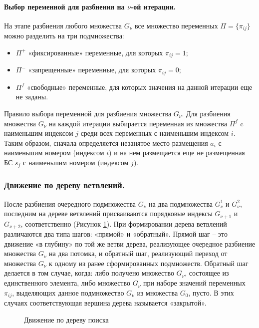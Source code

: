 \paragraph{Выбор переменной для разбиения на $\nu$-ой итерации.}

На этапе разбиения любого множества $G_\nu$ все множество переменных $\Pi = \{\pi_{ij}\}$ можно разделить на три подмножества: 

\begin{itemize}
  \item $\Pi^+$ «фиксированные» переменные, для которых $\pi_{ij}=1$;
  \item $\Pi^-$ «запрещенные» переменные, для которых $\pi_{ij}=0$;
  \item $\Pi^f$ «свободные» переменные, для которых значения на данной итерации еще не заданы.
\end{itemize}
Правило выбора переменной для разбиения множества $G_\nu$. Для разбиения множества $G_\nu$ на каждой итерации выбирается переменная из множества $\Pi^f$ c наименьшим индексом $j$ среди всех переменных с наименьшим индексом $i$. Таким образом, сначала определяется незанятое место размещения $a_i$ с наименьшим номером (индексом $i$) и на нем размещается еще не размещенная БС $s_j$ с наименьшим номером (индексом $j$).

\subsubsection{Движение по дереву ветвлений.}

После разбиения очередного подмножества $G_\nu$ на два подмножества $G^1_\nu$  и $G^2_\nu$, последним на дереве ветвлений присваиваются порядковые индексы $G_{\nu+1}$ и $G_{\nu+2}$, соответственно (Рисунок \ref{fig:part2_tree_traversal}).
При формировании дерева ветвлений различаются два типа шагов: «прямой» и «обратный». Прямой шаг -- это движение «в глубину» по той же ветви дерева, реализующее очередное разбиение множества $G_\nu$ на два потомка, и обратный шаг, реализующий переход от множества $G_\nu$  к одному из ранее сформированных подмножеств. Обратный шаг делается в том случае, когда: либо получено множество $G_\nu$, состоящее из единственного элемента, либо множество $G_\nu$  при наборе значений переменных $\pi_{ij}$, выделяющих данное подмножество $G_\nu$ из множества $G_0$, пусто. В этих случаях соответствующая вершина дерева называется «закрытой».

\begin{figure}[ht]
  \caption{Движение по дереву поиска}\label{fig:part2_tree_traversal}
\end{figure}

